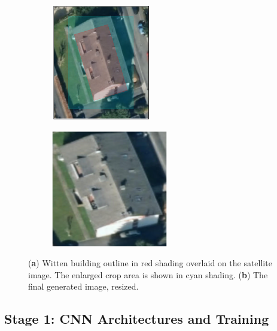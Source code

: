 \unskip
\begin{figure}[ht]
    \centering
    \begin{subfigure}[t]{0.5\columnwidth}
        \centering
        \includegraphics[height=2.0in]{chapter_4_roofshape/imgs/rgb_building_overlay.png}
        \caption{}
        \label{fig:rgb_overlay}
    \end{subfigure}%
    \hfill
    \begin{subfigure}[t]{0.5\columnwidth}
        \centering
        \includegraphics[height=2.0in]{chapter_4_roofshape/imgs/rgb_building.png}
        \caption{}
        \label{fig:rgb_building}
    \end{subfigure}
    \vspace{-12pt}

    \caption[Satellite image processing]{(\textbf{a}) Witten building outline in red shading overlaid on the satellite image. The enlarged crop area is shown in cyan shading. (\textbf{b}) The final generated image, resized.}
      \label{fig:rgb_building1}
\end{figure}


\subsection{Stage 1: CNN Architectures and Training} \label{sections:cnn_training_stage_one}

